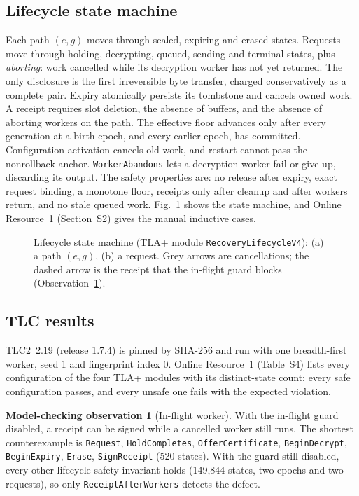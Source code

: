 \documentclass[pdflatex,sn-mathphys-num]{sn-jnl}%
\theoremstyle{plain}
\theoremstyle{definition}
\newtheorem{observation}{Model-checking observation}
\newcommand{\code}[1]{\texttt{#1}}
\begin{document}
\subsection{Lifecycle state machine}
Each path $(e,g)$ moves through sealed, expiring and erased states. Requests move through holding, decrypting, queued, sending and terminal states, plus \emph{aborting}: work cancelled while its decryption worker has not yet returned. The only disclosure is the first irreversible byte transfer, charged conservatively as a complete pair. Expiry atomically persists its tombstone and cancels owned work. A receipt requires slot deletion, the absence of buffers, and the absence of aborting workers on the path. The effective floor advances only after every generation at a birth epoch, and every earlier epoch, has committed. Configuration activation cancels old work, and restart cannot pass the nonrollback anchor. \code{WorkerAbandons} lets a decryption worker fail or give up, discarding its output. The safety properties are: no release after expiry, exact request binding, a monotone floor, receipts only after cleanup and after workers return, and no stale queued work. Fig.~\ref{fig:lifecycle} shows the state machine, and Online Resource~1 (Section~S2) gives the manual inductive cases.

\begin{figure}[t]
\centering
\figbox{}
\caption{Lifecycle state machine (TLA+ module \code{RecoveryLifecycleV4}): (a) a path $(e,g)$, (b) a request. Grey arrows are cancellations; the dashed arrow is the receipt that the in-flight guard blocks (Observation~\ref{obs:inflight}).}\label{fig:lifecycle}
\end{figure}

\subsection{TLC results}
TLC2~2.19 (release 1.7.4) is pinned by SHA-256 and run with one breadth-first worker, seed 1 and fingerprint index 0. Online Resource~1 (Table~S4) lists every configuration of the four TLA+ modules with its distinct-state count: every safe configuration passes, and every unsafe one fails with the expected violation.

\begin{observation}[In-flight worker]\label{obs:inflight}
With the in-flight guard disabled, a receipt can be signed while a cancelled worker still runs. The shortest counterexample is \code{Request}, \code{HoldCompletes}, \code{OfferCertificate}, \code{BeginDecrypt}, \code{BeginExpiry}, \code{Erase}, \code{SignReceipt} (520 states). With the guard still disabled, every other lifecycle safety invariant holds (149,844 states, two epochs and two requests), so only \code{ReceiptAfterWorkers} detects the defect.
\end{observation}
\end{document}
